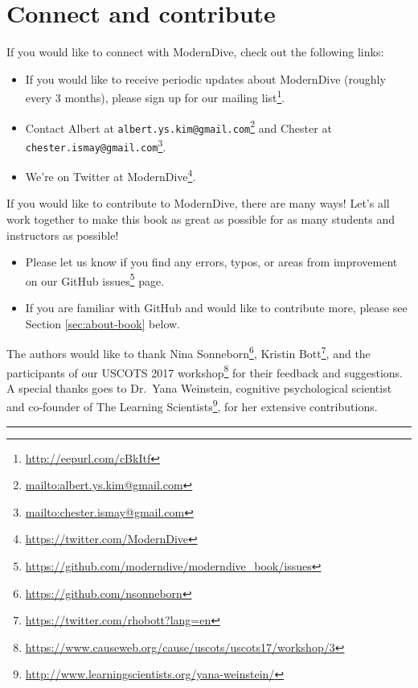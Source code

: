 \documentclass[12pt,]{krantz}
\providecommand{\tightlist}{%
  \setlength{\itemsep}{0pt}\setlength{\parskip}{0pt}}
\renewcommand{\href}[2]{#2\footnote{\url{#1}}}
\begin{document}
\hypertarget{sec:connect-contribute}{\section{Connect and
contribute}\label{sec:connect-contribute}}

If you would like to connect with ModernDive, check out the following
links:

\begin{itemize}
\tightlist
\item
  If you would like to receive periodic updates about ModernDive
  (roughly every 3 months), please sign up for our
  \href{http://eepurl.com/cBkItf}{mailing list}.
\item
  Contact Albert at
  \href{mailto:albert.ys.kim@gmail.com}{\nolinkurl{albert.ys.kim@gmail.com}}
  and Chester at
  \href{mailto:chester.ismay@gmail.com}{\nolinkurl{chester.ismay@gmail.com}}.
\item
  We're on Twitter at \href{https://twitter.com/ModernDive}{ModernDive}.
\end{itemize}

If you would like to contribute to ModernDive, there are many ways!
Let's all work together to make this book as great as possible for as
many students and instructors as possible!

\begin{itemize}
\tightlist
\item
  Please let us know if you find any errors, typos, or areas from
  improvement on our
  \href{https://github.com/moderndive/moderndive_book/issues}{GitHub
  issues} page.
\item
  If you are familiar with GitHub and would like to contribute more,
  please see Section \ref{sec:about-book} below.
\end{itemize}

The authors would like to thank
\href{https://github.com/nsonneborn}{Nina Sonneborn},
\href{https://twitter.com/rhobott?lang=en}{Kristin Bott}, and the
participants of our
\href{https://www.causeweb.org/cause/uscots/uscots17/workshop/3}{USCOTS
2017 workshop} for their feedback and suggestions. A special thanks goes
to Dr.~Yana Weinstein, cognitive psychological scientist and co-founder
of \href{http://www.learningscientists.org/yana-weinstein/}{The Learning
Scientists}, for her extensive contributions.

\begin{center}\rule{0.5\linewidth}{\linethickness}\end{center}
\end{document}
